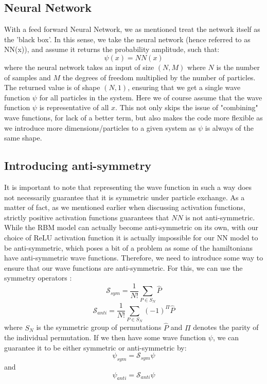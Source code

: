 \documentclass[12pt]{article}
\begin{document}
{\subsection{Neural Network}
With a feed forward Neural Network, we as mentioned treat the network itself as the 'black box'. In this sense, we take the neural network (hence referred to as NN(x)), and assume it returns the probability amplitude, such that:
\begin{equation*}
    \psi(x) = NN(x)
\end{equation*}
where the neural network takes an input of size $(N, M)$ where $N$ is the number of samples and $M$ the degrees of freedom multiplied by the number of particles. The returned value is of shape $(N, 1)$, ensuring that we get a single wave function $\psi$ for all particles in the system. Here we of course assume that the wave function $\psi$ is representative of all $x$. This not only skips the issue of "combining" wave functions, for lack of a better term, but also makes the code more flexible as we introduce more dimensions/particles to a given system as $\psi$ is always of the same shape.
\subsection{Introducing anti-symmetry}
It is important to note that representing the wave function in such a way does not necessarily guarantee that it is symmetric under particle exchange. As a matter of fact, as we mentioned earlier when discussing activation functions, strictly positive activation functions guarantees that $NN$ is not anti-symmetric. While the RBM model can actually become anti-symmetric on its own, with our choice of ReLU activation function it is actually impossible for our NN model to be anti-symmetric, which poses a bit of a problem as some of the hamiltonians have anti-symmetric wave functions. Therefore, we need to introduce some way to ensure that our wave functions are anti-symmetric. \newline
For this, we can use the symmetry operators \cite{symm}:
\begin{equation*}
    \mathcal{S}_{sym} = \frac{1}{N!} \sum_{P \in S_N} \hat P
\end{equation*}
\begin{equation*}
    \mathcal{S}_{anti} = \frac{1}{N!} \sum_{P \in S_N} (-1)^\Pi \hat P
\end{equation*}
where $S_N$ is the symmetric group of permutations $\hat P$ and $\Pi$ denotes the parity of the individual permutation.
\newline
If we then have some wave function $\psi$, we can guarantee it to be either symmetric or anti-symmetric by:
\begin{equation*}
    \psi_{sym} = \mathcal{S}_{sym} \psi
\end{equation*}
and
\begin{equation*}
    \psi_{anti} = \mathcal{S}_{anti} \psi
\end{equation*}
}
\end{document}
